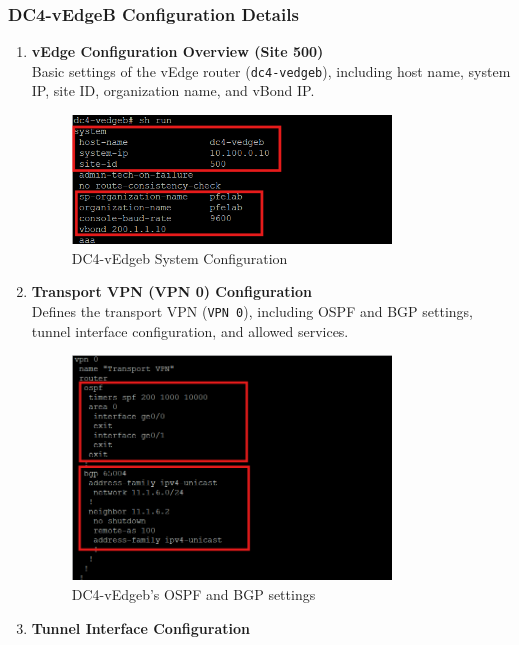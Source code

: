 \documentclass[12pt,english]{report}
\begin{document}
\subsubsection{DC4-vEdgeB Configuration Details}
\begin{enumerate}
    \item \textbf{vEdge Configuration Overview (Site 500)} \\
    Basic settings of the vEdge router (\texttt{dc4-vedgeb}), including host name, system IP, site ID, organization name, and vBond IP.
\begin{figure}[H]
    \centering
    \includegraphics[width= 0.8\textwidth]{chapitre 3/4vedgeb1.png}
    \caption{DC4-vEdgeb System Configuration}
    \label{fig: DC4-vEdgeb System Configuration}
\end{figure}    
    \item \textbf{Transport VPN (VPN 0) Configuration} \\
    Defines the transport VPN (\texttt{VPN 0}), including OSPF and BGP settings, tunnel interface configuration, and allowed services.
\begin{figure}[H]
    \centering
    \includegraphics[width= 0.8\textwidth]{chapitre 3/4vedgeb2.png}
    \caption{DC4-vEdgeb's OSPF and BGP settings}
    \label{fig: DC4-vEdgea's OSPF and BGP settings}
\end{figure}    
    \item \textbf{Tunnel Interface Configuration} \\

\end{enumerate}
\end{document}
